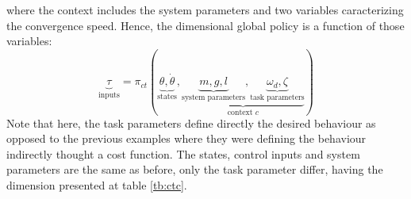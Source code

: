 where the context includes the system parameters and two variables caracterizing the convergence speed. Hence, the dimensional global policy is a function of those variables:
\begin{equation}
\underbrace{\tau}_{\text{inputs}}
=
\pi_{ct} \left(
\underbrace{ \theta, \dot{\theta} }_{\text{states}},
\underbrace{
\underbrace{ m , g , l }_{\text{system parameters}},
\underbrace{ \omega_d , \zeta }_{\text{task parameters}}
}_{\text{context $c$}}
\right)
\label{tb:ctc}
\end{equation}
Note that here, the task parameters define directly the desired behaviour as opposed to the previous examples where they were defining the behaviour indirectly thought a cost function. The states, control inputs and system parameters are the same as before, only the task parameter differ, having the dimension presented at table \ref{tb:ctc}.
